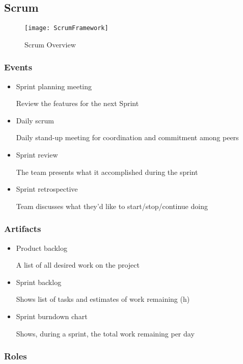 \documentclass[../ESOF_notes.tex]{subfiles}
\begin{document}
 

\subsection{Scrum}

\begin{figure}[H]
    \centering
    \texttt{[image: ScrumFramework]}
    \caption{Scrum Overview}
\end{figure}

\subsubsection{Events}

\begin{itemize}
    \item Sprint planning meeting
    
    Review the features for the next Sprint
    \item Daily scrum
    
    Daily stand-up meeting for coordination and commitment among peers
    \item Sprint review
    
    The team presents what it accomplished during the sprint
    \item Sprint retrospective
    
    Team discusses what they'd like to start/stop/continue doing
\end{itemize}

\subsubsection{Artifacts}

\begin{itemize}
    \item Product backlog
    
    A list of all desired work on the project
    \item Sprint backlog
    
    Shows list of tasks and estimates of work remaining (h)
    \item Sprint burndown chart
    
    Shows, during a sprint, the total work remaining per day
\end{itemize}

\subsubsection{Roles}
\end{document}
